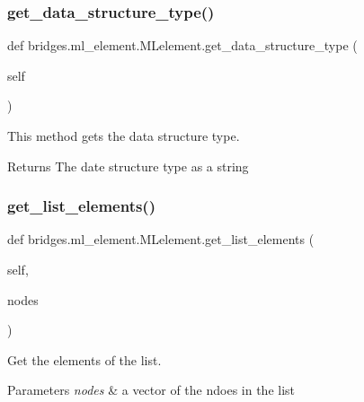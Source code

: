 \subsubsection{\texorpdfstring{get\+\_\+data\+\_\+structure\+\_\+type()}{get\_data\_structure\_type()}}
{\footnotesize\ttfamily def bridges.\+ml\+\_\+element.\+M\+Lelement.\+get\+\_\+data\+\_\+structure\+\_\+type (\begin{DoxyParamCaption}\item[{}]{self }\end{DoxyParamCaption})}



This method gets the data structure type. 

\begin{DoxyReturn}{Returns}
The date structure type as a string 
\end{DoxyReturn}
\mbox{\label{classbridges_1_1ml__element_1_1_m_lelement_a3996cd2cec7c3978437392eba2ef66eb}} 
\subsubsection{\texorpdfstring{get\+\_\+list\+\_\+elements()}{get\_list\_elements()}}
{\footnotesize\ttfamily def bridges.\+ml\+\_\+element.\+M\+Lelement.\+get\+\_\+list\+\_\+elements (\begin{DoxyParamCaption}\item[{}]{self,  }\item[{}]{nodes }\end{DoxyParamCaption})}



Get the elements of the list. 


\begin{DoxyParams}{Parameters}
{\em nodes} & a vector of the ndoes in the list \\
\hline
\end{DoxyParams}
\mbox{\label{classbridges_1_1ml__element_1_1_m_lelement_a951795a932cf17381d1d90515e3fc985}} 
